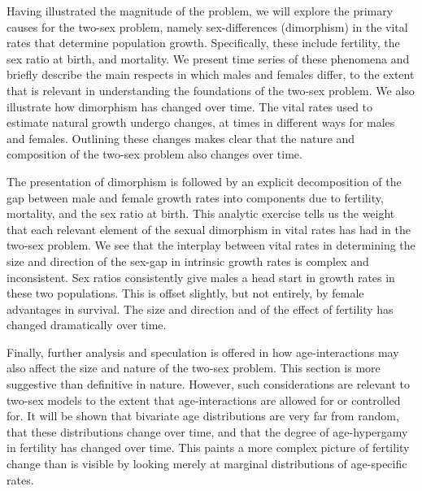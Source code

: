 Having illustrated the magnitude of the problem, we will explore the primary
causes for the two-sex problem, namely sex-differences (dimorphism) in the vital rates
that determine population growth. Specifically, these include fertility, the sex
ratio at birth, and mortality. We present time series of these phenomena and
briefly describe the main respects in which males and females differ, to the
extent that is relevant in understanding the foundations of the two-sex problem.
We also illustrate how dimorphism has changed over time. The vital rates
used to estimate natural growth undergo changes, at times in different ways for
males and females. Outlining these changes makes clear that the nature and
composition of the two-sex problem also changes over time.

The presentation of dimorphism is followed by an explicit decomposition of the
gap between male and female growth rates into components due to fertility,
mortality, and the sex ratio at birth. This analytic exercise tells us the
weight that each relevant element of the sexual dimorphism in vital rates has
had in the two-sex problem. We see that the interplay between vital rates
in determining the size and direction of the sex-gap in intrinsic growth rates
is complex and inconsistent. Sex ratios consistently give males a head start in
growth rates in these two populations. This is offset slightly, but not
entirely, by female advantages in survival. The size and direction and of the effect of
fertility has changed dramatically over time.

Finally, further analysis and speculation is offered in how age-interactions may
also affect the size and nature of the two-sex problem. This section is more
suggestive than definitive in nature. However, such considerations are relevant
to two-sex models to the extent that age-interactions are allowed for or
controlled for. It will be shown that bivariate age distributions are very far
from random, that these distributions change over time, and that the degree of
age-hypergamy in fertility has changed over time. This paints a more complex
picture of fertility change than is visible by looking merely at marginal
distributions of age-specific rates.









